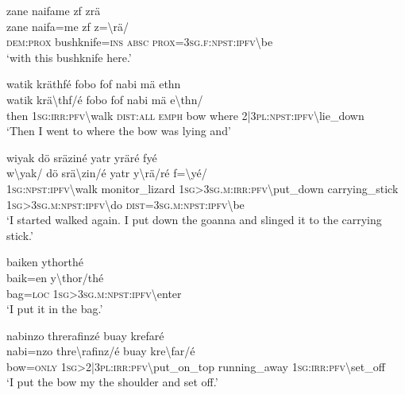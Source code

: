 \ea\label{ex:13:a1325}
zane naifame zf zrä\\
\gll zane	naifa=me	zf	z={\textbackslash}rä/\\
     \textsc{dem}:\textsc{prox}	bushknife=\textsc{ins}	\textsc{absc}	\textsc{prox}=3\textsc{sg}.\textsc{f}:\textsc{npst}:\textsc{ipfv}{\textbackslash}be\\
\glt `with this bushknife here.'
\z

\newpage
\ea\label{ex:13:a1326}
watik kräthfé fobo fof nabi mä ethn\\
\gll watik	krä{\textbackslash}thf/é	fobo	fof	nabi	mä	e{\textbackslash}thn/\\
     then	1\textsc{sg}:\textsc{irr}:\textsc{pfv}{\textbackslash}walk	\textsc{dist}:\textsc{all}	\textsc{emph}	bow	where	2|3\textsc{pl}:\textsc{npst}:\textsc{ipfv}{\textbackslash}lie\_down\\
\glt `Then I went to where the bow was lying and'
\z

\ea\label{ex:13:a1328}
wiyak dö sräziné yatr yräré fyé\\
\gll w{\textbackslash}yak/	dö	srä{\textbackslash}zin/é	yatr	y{\textbackslash}rä/ré	f={\textbackslash}yé/\\
     1\textsc{sg}:\textsc{npst}:\textsc{ipfv}{\textbackslash}walk	monitor\_lizard	1\textsc{sg}>3\textsc{sg}.\textsc{m}:\textsc{irr}:\textsc{pfv}{\textbackslash}put\_down	carrying\_stick	1\textsc{sg}>3\textsc{sg}.\textsc{m}:\textsc{npst}:\textsc{ipfv}{\textbackslash}do	\textsc{dist}=3\textsc{sg}.\textsc{m}:\textsc{npst}:\textsc{ipfv}{\textbackslash}be\\
\glt `I started walked again. I put down the goanna and slinged it to the carrying stick.'
\z

\ea\label{ex:13:a1330}
baiken ythorthé\\
\gll baik=en	y{\textbackslash}thor/thé\\
     bag=\textsc{loc}	1\textsc{sg}>3\textsc{sg}.\textsc{m}:\textsc{npst}:\textsc{ipfv}{\textbackslash}enter\\
\glt `I put it in the bag.'
\z

\ea\label{ex:13:a1331}
nabinzo threrafinzé buay krefaré\\
\gll nabi=nzo	thre{\textbackslash}rafinz/é	buay	kre{\textbackslash}far/é\\
     bow=\textsc{only}	1\textsc{sg}>2|3\textsc{pl}:\textsc{irr}:\textsc{pfv}{\textbackslash}put\_on\_top	running\_away	1\textsc{sg}:\textsc{irr}:\textsc{pfv}{\textbackslash}set\_off\\
\glt `I put the bow my the shoulder and set off.'
\z

